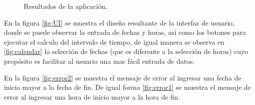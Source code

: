 \documentclass[conference]{IEEEtran}
\begin{document}
    \begin{figure}[!ht]
        \centering
        \hfill
        \caption{Resultados de la aplicación.}
        \label{fig:res}
    \end{figure}

    En la figura \ref{fig:UI} se muestra el diseño resultante de la interfaz de usuario, donde se puede observar la entrada de fechas y horas, así como los botones para ejecutar el calculo del intervalo de tiempo, de igual manera se observa en \ref{fig:calendar} la selección de fechas (que es diferente a la selección de horas) cuyo propósito es facilitar al usuario una mas fácil entrada de datos. 

    En la figura \ref{fig:error2} se muestra el mensaje de error al ingresar una fecha de inicio mayor a la fecha de fin. De igual forma \ref{fig:error1} se muestra el mensaje de error al ingresar una hora de inicio mayor a la hora de fin.
\end{document}
